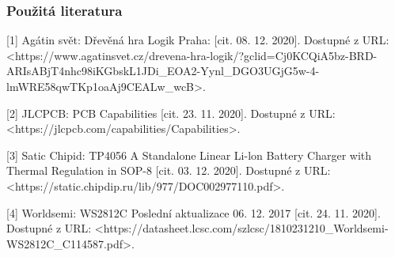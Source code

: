 \documentclass[%
  12pt,       				%
	t,                  %
	aspectratio=1610,   %
	unicode,						%
]{beamer}				    	%
\begin{document}
\begin{frame}[c] 
	\frametitle{Použitá literatura}
	[1] Agátin svět: Dřevěná hra Logik Praha: [cit. 08. 12. 2020]. Dostupné z URL:
	<https://www.agatinsvet.cz/drevena-hra-logik/?gclid=Cj0KCQiA5bz-BRD-ARIsABjT4nhc98iKGbskL1JDi\_EOA2-Yynl\_DGO3UGjG5w-4-lmWRE58qwTKp1oaAj9CEALw\_wcB>.

	[2] JLCPCB: PCB Capabilities [cit. 23. 11. 2020]. Dostupné z URL:
	<https://jlcpcb.com/capabilities/Capabilities>.

	[3] Satic Chipid: TP4056 A Standalone Linear Li-lon Battery Charger with Thermal Regulation in SOP-8 [cit. 03. 12. 2020]. Dostupné z URL:
	<https://static.chipdip.ru/lib/977/DOC002977110.pdf>.

	[4] Worldsemi: WS2812C Poslední aktualizace 06. 12. 2017 [cit. 24. 11. 2020]. Dostupné z URL:
	<https://datasheet.lcsc.com/szlcsc/1810231210\_Worldsemi-WS2812C\_C114587.pdf>.

\end{frame}

\end{document}
